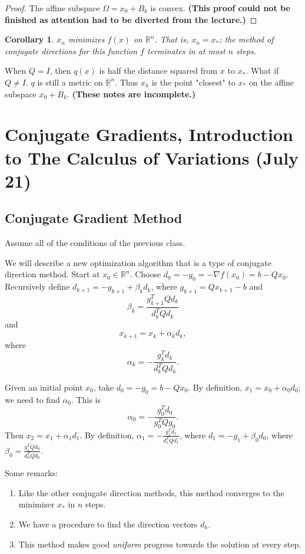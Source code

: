 \documentclass[11pt]{article}
\newcommand{\R}{\mathbb{R}}
\newtheorem{corollary}{Corollary}[subsection]
\begin{document}
\begin{proof}
The affine subspace $\Omega = x_0 + B_k$ is convex. \textbf{(This proof could not be finished as attention had to be diverted from the lecture.)}
\end{proof}

\begin{corollary}
$x_n$ minimizes $f(x)$ on $\R^n$. That is, $x_n = x_*$; the method of conjugate directions for this function $f$ terminates in at most $n$ steps. 
\end{corollary}

When $Q = I$, then $q(x)$ is half the distance squared from $x$ to $x_*$. What if $Q \neq I$. $q$ is still a metric on $\R^n$. Thus $x_k$ is the point "closest" to $x_*$ on the affine subspace $x_0 + B_k$. \textbf{(These notes are incomplete.)}

\newpage

\section{Conjugate Gradients, Introduction to The Calculus of Variations (July 21)}

\subsection{Conjugate Gradient Method}

Assume all of the conditions of the previous class.

We will describe a new optimization algorithm that is a type of conjugate direction method. Start at $x_0 \in \R^n$. Choose $d_0 = -g_0 = -\nabla f(x_0) = b - Qx_0$. Recursively define $d_{k+1} = -g_{k+1} + \beta_k d_k$, where $g_{k+1} = Qx_{k+1} - b$ and
\[
\beta_k = \frac{g_{k+1}^T Q d_k}{d_k^TQd_k}
\]
and
\[
x_{k+1} = x_k + \alpha_k d_k,
\]
where
\[
\alpha_k = -\frac{g_k^T d_k}{d_k^T Q d_k}.
\]

Given an initial point $x_0$, take $d_0 = -g_0 = b - Qx_0$. By definition, $x_1 = x_0 + \alpha_0 d_0$; we need to find $\alpha_0$. This is
\[
\alpha_0 = -\frac{g_0^Td_0}{g_0^TQg_0}.
\]
Then $x_2 = x_1 + \alpha_1 d_1$. By definition, $\alpha_1 = -\frac{g_1^T d_1}{d_1^TQd_1}$, where $d_1 = -g_1 + \beta_0 d_0$, where $\beta_0 = \frac{g_1^TQd_0}{d_0^TQd_0}$.

Some remarks:
\begin{enumerate}
\item
Like the other conjugate direction methods, this method converges to the minimizer $x_*$ in $n$ steps.
\item
We have a procedure to find the direction vectors $d_k$.
\item
This method makes good \emph{uniform} progress towards the solution at every step.
\end{enumerate}
\end{document}
